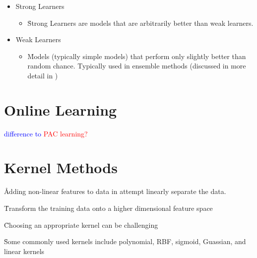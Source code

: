 \begin{itemize}[noitemsep,topsep=0pt]
	\item Strong Learners
	\begin{itemize}[noitemsep,topsep=0pt]
		\item \r{Strong Learners are models that are arbitrarily better than weak learners.}
	\end{itemize}
	\item Weak Learners
	\begin{itemize}[noitemsep,topsep=0pt]
		\item \r{Models (typically simple models) that perform only slightly better than random chance. Typically used in ensemble methods (discussed in more detail in \ALR)}
	\end{itemize}
\end{itemize}

\section{Online Learning}

\textcolor{blue}{difference to \textcolor{red}{PAC learning?}}


\section{Kernel Methods}
\label{sec:kernel_trick}

\r{Adding non-linear features to data in attempt linearly separate the data.}


\r{Transform the training data onto a higher dimensional feature space}


\r{Choosing an appropriate kernel can be challenging}


\r{Some commonly used kernels include polynomial, RBF, sigmoid, Guassian, and linear kernels}


